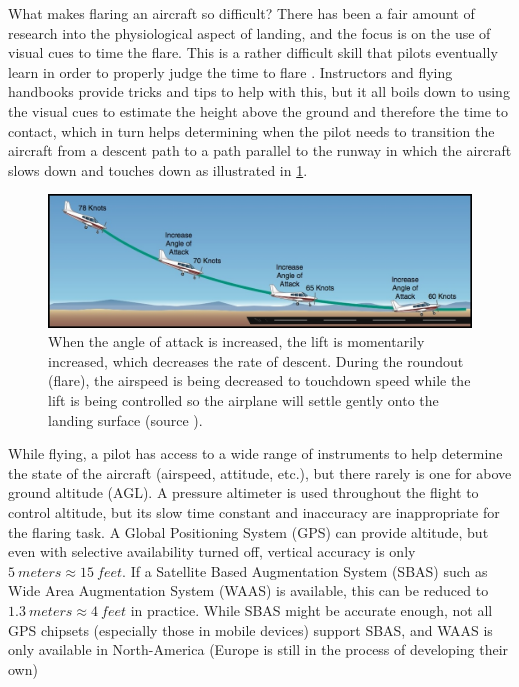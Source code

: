\documentclass[letterpaper, conference]{IEEEtran}  %
\begin{document}
What makes flaring an aircraft so difficult? There has been a fair amount of research into the physiological aspect of landing, and the focus is on the use of visual cues to time the flare. This is a rather difficult skill that pilots eventually learn in order to properly judge the time to flare \cite{Palmisano2005}. Instructors and flying handbooks provide tricks and tips to help with this, but it all boils down to using the visual cues to estimate the height above the ground and therefore the time to contact, which in turn helps determining when the pilot needs to transition the aircraft from a descent path to a path parallel to the runway in which the aircraft slows down and touches down as illustrated in \cref{fig:flare}.


\begin{figure}[ht]
\centering
\includegraphics[width=\columnwidth]{flare.jpg} 
\caption{When the angle of attack is increased, the lift is momentarily increased, which decreases the rate of descent.  During the roundout (flare), the airspeed is being decreased to touchdown speed while the lift is being controlled so the airplane will settle gently onto the landing surface (source \cite{FAASafety}).}
\label{fig:flare}
\end{figure}

While flying, a pilot has access to a wide range of instruments to help determine the state of the aircraft (airspeed, attitude, etc.), but there rarely is one for above ground altitude (AGL). A pressure altimeter is used throughout the flight to control altitude, but its slow time constant and inaccuracy are inappropriate for the flaring task. A Global Positioning System (GPS) can provide altitude, but even with selective availability turned off, vertical accuracy is only $\SI{5}{meters} \approx \SI{15}{feet}$. If a Satellite Based Augmentation System (SBAS) such as Wide Area Augmentation System (WAAS) is available, this can be reduced to $\SI{1.3}{meters} \approx \SI{4}{feet}$ in practice. While SBAS might be accurate enough, not all GPS chipsets (especially those in mobile devices) support SBAS, and WAAS is only available in North-America (Europe is still in the process of developing their own) \cite{WAASwiki}
\end{document}
